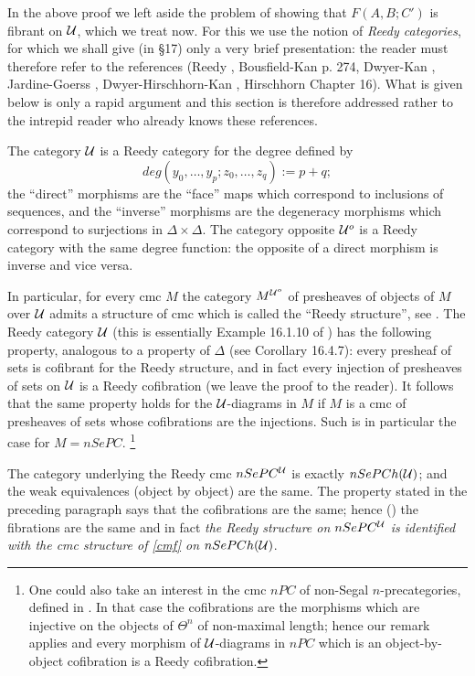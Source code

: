In the above proof we left aside the
problem of
showing that $F(A,B;C')$ is fibrant on ${\cal U}$, which we
treat now. For this we use the
notion of \emph{Reedy categories},
for which we shall give (in \S 17) only a very
brief presentation: the reader must therefore refer to the
references (Reedy \cite{Reedy}, Bousfield-Kan \cite{BousfieldKan} p. 274,
Dwyer-Kan \cite{DwyerKan3},
Jardine-Goerss \cite{JardineGoerssBook}, Dwyer-Hirschhorn-Kan \cite{DHK},
Hirschhorn \cite{Hirschhorn} Chapter 16). What is given below is
only a rapid argument and
this section is therefore addressed rather to the intrepid reader who already
knows these references.

The category ${\cal U}$ is a Reedy category for the degree
defined by
$$
deg (y_0,\ldots , y_p; z_0,\ldots , z_q):= p+q;
$$
the ``direct'' morphisms
are
the ``face'' maps which correspond to inclusions of sequences, and
the ``inverse'' morphisms are the degeneracy morphisms
which correspond to surjections in $\Delta \times \Delta$.
The category
opposite ${\cal U}^o$ is a Reedy category with the same degree
function: the opposite of a direct morphism is inverse
and vice versa.

In particular, for every cmc $M$ the category $M^{{\cal U}
^o}$ of presheaves of objects of $M$ over ${\cal U}$ admits a
structure of
cmc which is called the ``Reedy structure'', see \cite{Hirschhorn}.  The
Reedy category ${\cal U}$ (this is essentially Example 16.1.10 of
\cite{Hirschhorn}) has the following property, analogous to a property of
$\Delta$ (see \cite{Hirschhorn} Corollary 16.4.7):
every
presheaf of sets is cofibrant for the Reedy structure, and in fact
every injection of presheaves of sets on ${\cal U}$ is a Reedy cofibration
(we leave the proof to the reader). It follows that the same
property holds for the ${\cal U}$-diagrams in $M$ if $M$ is a cmc of
presheaves of sets whose cofibrations are the injections.
Such is in particular the case for $M=nSePC$.  \footnote{
One could also take an interest in the cmc $nPC$ of non-Segal
$n$-precategories,
defined in \cite{nCAT}.
In that case the cofibrations are the morphisms which are
injective on the objects of $\Theta ^ n$ of non-maximal length; hence our
remark applies and every morphism of ${\cal U}$-diagrams in $nPC$ which is
an object-by-object cofibration is a Reedy cofibration.}

The category underlying the Reedy cmc $nSePC^{{\cal U}}$ is
exactly
$nSePCh({\cal U} )$; and the weak equivalences (object by object) are the
same. The property stated in the preceding paragraph
says that the cofibrations are the same; hence (\cite{Quillen}) the fibrations
are the same and in fact \emph{the Reedy structure on $nSePC^{{\cal U}}$
is identified with the cmc structure of \ref{cmf} on $nSePCh({\cal U} )$}.

